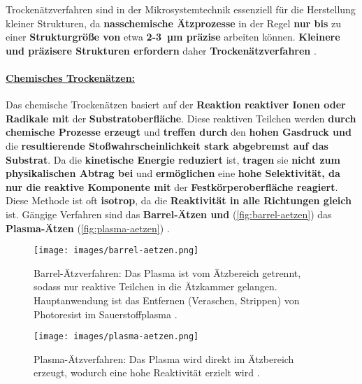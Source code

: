 \documentclass{article} %
\begin{document}
Trockenätzverfahren sind in der Mikrosystemtechnik essenziell für die Herstellung kleiner Strukturen, da \textbf{nasschemische Ätzprozesse} in der Regel \textbf{nur bis} zu einer \textbf{Strukturgröße von} etwa \textbf{2-3~µm präzise} arbeiten können. \textbf{Kleinere und präzisere Strukturen erfordern} daher \textbf{Trockenätzverfahren} \cite{madou2002}.

\paragraph{\uline{Chemisches Trockenätzen:}} Das chemische Trockenätzen basiert auf der \textbf{Reaktion reaktiver Ionen oder Radikale mit} der \textbf{Substratoberfläche}. Diese reaktiven Teilchen werden \textbf{durch chemische Prozesse erzeugt} und \textbf{treffen durch} den \textbf{hohen Gasdruck und} die \textbf{resultierende Stoßwahrscheinlichkeit stark abgebremst auf das Substrat}. Da die \textbf{kinetische Energie reduziert} ist, \textbf{tragen} sie \textbf{nicht zum physikalischen Abtrag bei} und \textbf{ermöglichen} eine \textbf{hohe Selektivität, da nur die reaktive Komponente mit} der \textbf{Festkörperoberfläche reagiert}. Diese Methode ist oft \textbf{isotrop}, da die \textbf{Reaktivität in alle Richtungen gleich} ist. Gängige Verfahren sind das \textbf{Barrel-Ätzen und} (\autoref{fig:barrel-aetzen}) das \textbf{Plasma-Ätzen} (\autoref{fig:plasma-aetzen}) \cite{schmid2024Aetzen}.

\begin{figure}[htb!]
    \centering
    \texttt{[image: images/barrel-aetzen.png]} %
    \captionsetup{labelfont=bf, width=.75\textwidth} %
    \caption{Barrel-Ätzverfahren: Das Plasma ist vom Ätzbereich getrennt, sodass nur reaktive Teilchen in die Ätzkammer gelangen. Hauptanwendung ist das Entfernen (Veraschen, Strippen) von Photoresist im Sauerstoffplasma \cite{schmid2024Aetzen}.}
    \label{fig:barrel-aetzen}
\end{figure}

\begin{figure}[htb!]
    \centering
    \texttt{[image: images/plasma-aetzen.png]} %
    \captionsetup{labelfont=bf, width=.65\textwidth} %
    \caption{Plasma-Ätzverfahren: Das Plasma wird direkt im Ätzbereich erzeugt, wodurch eine hohe Reaktivität erzielt wird \cite{schmid2024Aetzen}.}
    \label{fig:plasma-aetzen}
\end{figure}
\end{document}
